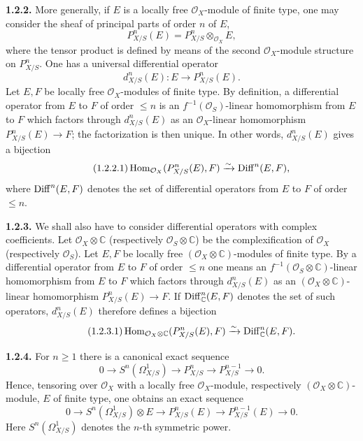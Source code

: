 \documentclass[11pt]{article}
\begin{document}
\textbf{1.2.2.} More generally, if $E$ is a locally free $\mathcal O_X$-module of finite type, one may consider the sheaf of principal parts of order $n$ of $E$,
\[
 P^n_{X/S}(E)=P^n_{X/S}\otimes_{\mathcal O_X}E,
\]
where the tensor product is defined by means of the second $\mathcal O_X$-module structure on $P^n_{X/S}$. One has a universal differential operator
\[
 d^n_{X/S}(E):E\longrightarrow P^n_{X/S}(E).
\]
Let $E,F$ be locally free $\mathcal O_X$-modules of finite type. By definition, a differential operator from $E$ to $F$ of order $\le n$ is an $f^{-1}(\mathcal O_S)$-linear homomorphism from $E$ to $F$ which factors through $d^n_{X/S}(E)$ as an $\mathcal O_X$-linear homomorphism $P^n_{X/S}(E)\to F$; the factorization is then unique. In other words, $d^n_{X/S}(E)$ gives a bijection
\begin{equation}\tag{1.2.2.1}
 \operatorname{Hom}_{\mathcal O_X}(P^n_{X/S}(E),F)\xrightarrow{\sim}\operatorname{Diff}^n(E,F),
\end{equation}
where $\operatorname{Diff}^n(E,F)$ denotes the set of differential operators from $E$ to $F$ of order $\le n$.

\textbf{1.2.3.} We shall also have to consider differential operators with complex coefficients. Let $\mathcal O_X\otimes\mathbb C$ (respectively $\mathcal O_S\otimes\mathbb C$) be the complexification of $\mathcal O_X$ (respectively $\mathcal O_S$). Let $E,F$ be locally free $(\mathcal O_X\otimes\mathbb C)$-modules of finite type. By a differential operator from $E$ to $F$ of order $\le n$ one means an $f^{-1}(\mathcal O_S\otimes\mathbb C)$-linear homomorphism from $E$ to $F$ which factors through $d^n_{X/S}(E)$ as an $(\mathcal O_X\otimes\mathbb C)$-linear homomorphism $P^n_{X/S}(E)\to F$. If $\operatorname{Diff}^n_{\mathbb C}(E,F)$ denotes the set of such operators, $d^n_{X/S}(E)$ therefore defines a bijection
\begin{equation}\tag{1.2.3.1}
 \operatorname{Hom}_{\mathcal O_X\otimes\mathbb C}(P^n_{X/S}(E),F)
 \xrightarrow{\sim}\operatorname{Diff}^n_{\mathbb C}(E,F).
\end{equation}

\textbf{1.2.4.} For $n\ge1$ there is a canonical exact sequence
\[
 0\longrightarrow S^n(\Omega^1_{X/S})\longrightarrow P^n_{X/S}
 \longrightarrow P^{n-1}_{X/S}\longrightarrow 0.
\]
Hence, tensoring over $\mathcal O_X$ with a locally free $\mathcal O_X$-module, respectively $(\mathcal O_X\otimes\mathbb C)$-module, $E$ of finite type, one obtains an exact sequence
\begin{equation}\tag{1.2.4.1}
0\longrightarrow S^n(\Omega^1_{X/S})\otimes E\longrightarrow P^n_{X/S}(E)
\longrightarrow P^{n-1}_{X/S}(E)\longrightarrow0.
\end{equation}
Here $S^n(\Omega^1_{X/S})$ denotes the $n$-th symmetric power.
\end{document}
